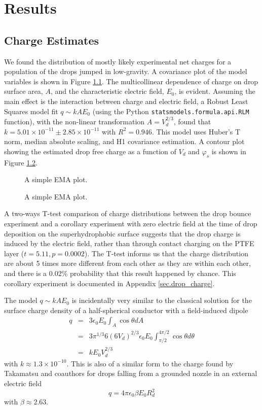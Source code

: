 \documentclass[12pt,a4paper,oneside]{book}
\begin{document}
\chapter{Results}
\section{Charge Estimates}
We found the distribution of mostly likely experimental net charges for a population of the drops jumped in low-gravity. A covariance plot of the model variables is shown in Figure \ref{fig:scatter}. The multicollinear dependence of charge on drop surface area, $A$, and the characteristic electric field, $E_0$, is evident. Assuming the main effect is the interaction between charge and electric field, a Robust Least Squares model fit $q \sim kAE_0$ (using the Python \verb|statsmodels.formula.api.RLM| function), with the non-linear transformation $A = V_d^{2/3}$, found that $k=5.01 \times 10^{-11} \pm  2.85 \times 10^{-11}$ with $R^2 = 0.946$. This model uses Huber's T norm, median absolute scaling, and H1 covariance estimation. A contour plot showing the estimated drop free charge as a function of $V_d$ and $\varphi_s$ is shown in Figure \ref{fig:charge}.
\begin{figure}[htb]
    \centering
    \resizebox{12cm}{!}{}
    \caption{A simple EMA plot.\label{fig:scatter}}
\end{figure}
\begin{figure}[htb]
    \centering
    
    \caption{A simple EMA plot.\label{fig:charge}}
\end{figure}

A two-ways T-test comparison of charge distributions between the drop bounce experiment and a corollary experiment with zero electric field at the time of drop deposition on the superhydrophobic surface suggests that the drop charge is induced by the electric field, rather than through contact charging on the PTFE layer ($t = 5.11, p = 0.0002$). The T-test informs us that the charge distribution  are about 5 times more different from each other as they are within each other, and there is a 0.02$\%$ probability that this result happened by chance. This corollary experiment is documented in Appendix \ref{sec.drop_charge}.

The model $q \sim kAE_0$ is incidentally very similar to the classical solution for the surface charge density of a half-spherical conductor with a field-induced dipole \cite{david_j._griffiths_introduction_1999}
\begin{eqnarray*}
q &=& 3 \epsilon_0 E_0 \int_A \cos \theta dA \\
&=& 3 \pi^{1/3} 6 \left(6 V_d \right)^{2/3} \epsilon_0 E_0 \int^{4 \pi/2}_{\pi / 2} \cos \theta d\theta \\
&=& k E_0 V_d^{2/3}
\end{eqnarray*}
with $k \approx 1.3 \times 10^{-10}$. This is also of a similar form to the charge found by Takamatsu and coauthors for drops falling from a grounded nozzle in an external electric field \cite{takamatsu_theoretical_1981}
\[q = 4 \pi \epsilon_0 \beta E_0 R_d^2 \]
with $\beta \approx 2.63$.
\end{document}
